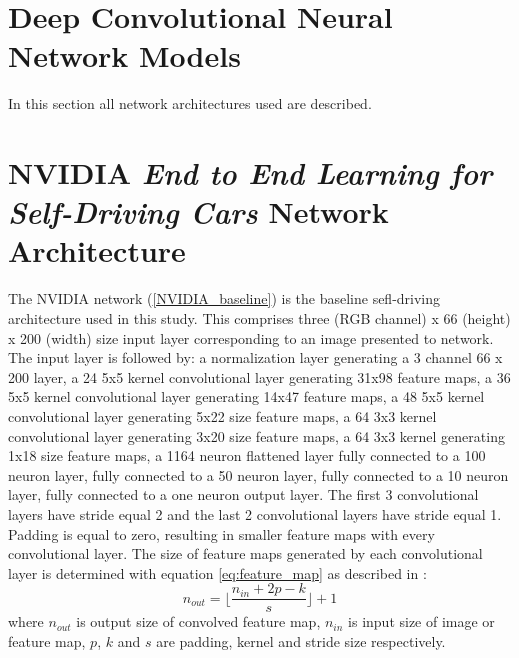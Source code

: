

\section{Deep Convolutional Neural Network Models}

In this section all network architectures used are described.

\section{NVIDIA \textit{End to End Learning for Self-Driving Cars} Network Architecture}

The NVIDIA network (\ref{NVIDIA_baseline}) is the baseline sefl-driving architecture used in this study. This comprises three (RGB channel) x 66 (height) x 200 (width) size input layer corresponding to an image presented to network. The input layer is followed by: a normalization layer generating a 3 channel 66 x 200 layer, a 24 5x5 kernel convolutional layer generating 31x98 feature maps, a 36 5x5 kernel convolutional layer generating 14x47 feature maps, a 48 5x5 kernel convolutional layer generating 5x22 size feature maps, a 64 3x3 kernel convolutional layer generating 3x20 size feature maps, a 64 3x3 kernel generating 1x18 size feature maps, a 1164 neuron flattened layer fully connected to a 100 neuron layer, fully connected to a 50 neuron layer, fully connected to a 10 neuron layer, fully connected to a one neuron output layer.  
The first 3 convolutional layers have stride equal 2 and the last 2 convolutional layers have stride equal 1. Padding is equal to zero, resulting in smaller feature maps with every convolutional layer.
The size of feature maps generated by each convolutional layer is determined with equation \ref{eq:feature_map} as described in \cite{dumoulin2018guide}:
\begin{equation}
    \label{eq:feature_map}
    n_{out}= \Big\lfloor\frac{n_{in} + 2p -k}{s} \Big\rfloor +1
\end{equation}
where $n_{out}$ is output size of convolved feature map, $n_{in}$ is input size of image or feature map, $p$, $k$ and $s$ are padding, kernel and stride size respectively.  
 

